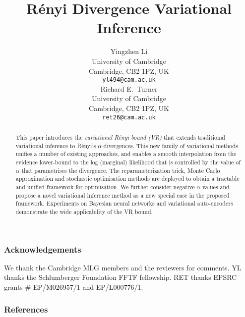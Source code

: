 \documentclass{article}
\title{R{\'e}nyi Divergence Variational Inference}
\author{
  Yingzhen Li \\
  University of Cambridge\\
  Cambridge, CB2 1PZ, UK \\
  \texttt{yl494@cam.ac.uk} \\
  \And
  Richard E.~Turner \\
  University of Cambridge\\
  Cambridge, CB2 1PZ, UK \\
  \texttt{ret26@cam.ac.uk} \\
}
\begin{document}

\maketitle

\begin{abstract}
This paper introduces the \emph{variational R{\'e}nyi bound (VR)} that extends traditional variational inference to R{\'e}nyi's $\alpha$-divergences. This new family of variational methods unifies a number of existing approaches, and enables a smooth interpolation from the evidence lower-bound to the log (marginal) likelihood that is controlled by the value of $\alpha$ that parametrises the divergence. The reparameterization trick, Monte Carlo approximation and stochastic optimisation methods are deployed to obtain a tractable and unified framework for optimisation. We further consider negative $\alpha$ values and propose a novel variational inference method as a new special case in the proposed framework. Experiments on Bayesian neural networks and variational auto-encoders demonstrate the wide applicability of the VR bound.
\end{abstract}













\subsubsection*{Acknowledgements}
We thank the Cambridge MLG members and the reviewers for comments. YL thanks the Schlumberger Foundation FFTF fellowship. RET thanks EPSRC grants \# EP/M026957/1 and EP/L000776/1.

\subsubsection*{References}
\renewcommand{\section}[2]{}
\setlength{\bibsep}{0pt plus 0.3ex}

\small

\end{document}
